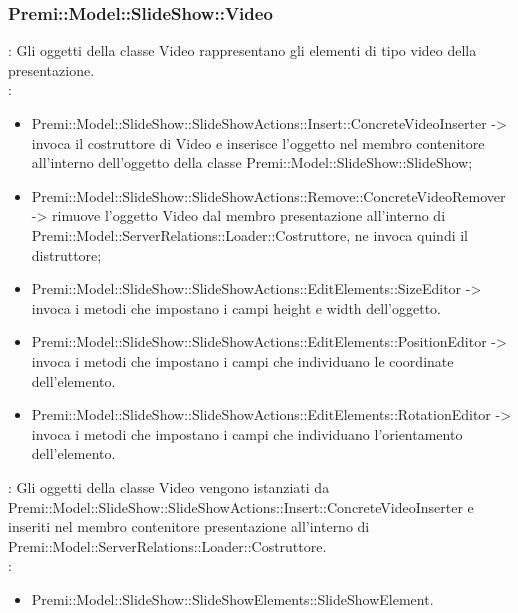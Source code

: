 {                    \subsubsection{Premi::Model::SlideShow::Video}{
				\textbf{\tipo}: Gli oggetti della classe Video rappresentano gli elementi di tipo video della presentazione.\\
				\textbf{\relaz}: 
				\begin{itemize}
					\item Premi::Model::SlideShow::SlideShowActions::Insert::ConcreteVideoInserter -> invoca il costruttore di Video e inserisce l’oggetto nel membro contenitore all’interno dell’oggetto della classe Premi::Model::SlideShow::SlideShow;
                    \item Premi::Model::SlideShow::SlideShowActions::Remove::ConcreteVideoRemover -> rimuove l’oggetto Video dal membro presentazione all’interno di Premi::Model::ServerRelations::Loader::Costruttore, ne invoca quindi il distruttore;
                     \item Premi::Model::SlideShow::SlideShowActions::EditElements::SizeEditor -> invoca i metodi che impostano i campi height e width dell'oggetto.
                    \item Premi::Model::SlideShow::SlideShowActions::EditElements::PositionEditor -> invoca i metodi che impostano i campi che individuano le coordinate dell'elemento.
                    \item Premi::Model::SlideShow::SlideShowActions::EditElements::RotationEditor -> invoca i metodi che impostano i campi che individuano l'orientamento dell'elemento.
				\end{itemize}	
                \textbf{\interfacce}: Gli oggetti della classe Video vengono istanziati da Premi::Model::SlideShow::SlideShowActions::Insert::ConcreteVideoInserter e inseriti nel membro contenitore presentazione all’interno di Premi::Model::ServerRelations::Loader::Costruttore.\\
                \textbf{\base}: 
                    \begin{itemize}
                    \item Premi::Model::SlideShow::SlideShowElements::SlideShowElement.
                    \end{itemize}
                    }     
}
